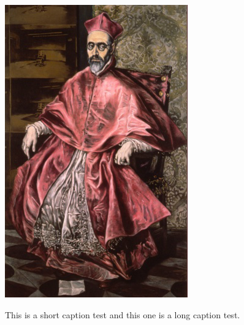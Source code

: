 \lipsum[1]
\includegraphics[height=0.8\textheight, width=\textwidth\relax]{./images/nino.png}

This is a short caption test and this one is a long caption test.

